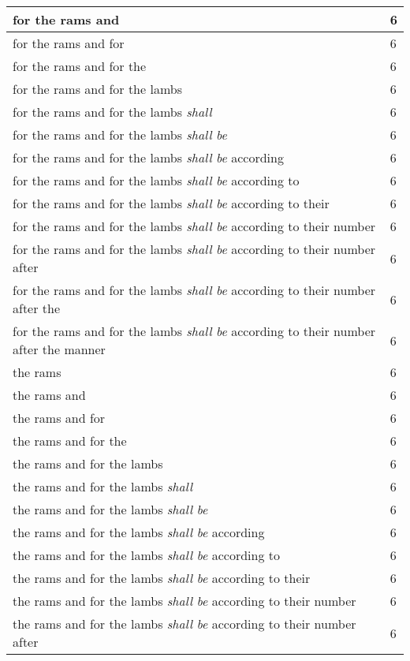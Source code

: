\begin{center}
\begin{longtable}{|p{3.0in}|p{0.5in}|}
for the rams and & 6\\ \hline 
for the rams and for & 6\\ \hline 
for the rams and for the & 6\\ \hline 
for the rams and for the lambs & 6\\ \hline 
for the rams and for the lambs \emph{shall} & 6\\ \hline 
for the rams and for the lambs \emph{shall} \emph{be} & 6\\ \hline 
for the rams and for the lambs \emph{shall} \emph{be} according & 6\\ \hline 
for the rams and for the lambs \emph{shall} \emph{be} according to & 6\\ \hline 
for the rams and for the lambs \emph{shall} \emph{be} according to their & 6\\ \hline 
for the rams and for the lambs \emph{shall} \emph{be} according to their number & 6\\ \hline 
for the rams and for the lambs \emph{shall} \emph{be} according to their number after & 6\\ \hline 
for the rams and for the lambs \emph{shall} \emph{be} according to their number after the & 6\\ \hline 
for the rams and for the lambs \emph{shall} \emph{be} according to their number after the manner & 6\\ \hline 
the rams & 6\\ \hline 
the rams and & 6\\ \hline 
the rams and for & 6\\ \hline 
the rams and for the & 6\\ \hline 
the rams and for the lambs & 6\\ \hline 
the rams and for the lambs \emph{shall} & 6\\ \hline 
the rams and for the lambs \emph{shall} \emph{be} & 6\\ \hline 
the rams and for the lambs \emph{shall} \emph{be} according & 6\\ \hline 
the rams and for the lambs \emph{shall} \emph{be} according to & 6\\ \hline 
the rams and for the lambs \emph{shall} \emph{be} according to their & 6\\ \hline 
the rams and for the lambs \emph{shall} \emph{be} according to their number & 6\\ \hline 
the rams and for the lambs \emph{shall} \emph{be} according to their number after & 6\\ \hline 

\end{longtable}
\end{center}
